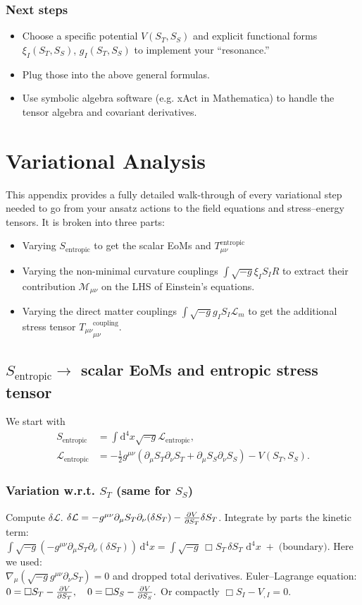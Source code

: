 \documentclass[11pt,a4paper]{article}
\newcommand{\Mmu}{\mathcal{M}}
\newcommand{\ST}{S_T}
\newcommand{\SSp}{S_S}
\newcommand{\Sentropic}{S_{\text{entropic}}}
\newcommand{\Lm}{\mathcal{L}_m}
\newcommand{\Tmnentropic}{T^{\text{entropic}}_{\mu\nu}}
\newcommand{\Adx}{\,\mathrm{d}^4x}
\newcommand{\Tmu}{T_{\mu\nu}}
\begin{document}
\subsubsection{Next steps}
\begin{itemize}
    \item Choose a specific potential $V(\ST,\SSp)$ and explicit functional forms $\xi_I(\ST,\SSp)$, $g_I(\ST,\SSp)$ to implement your ``resonance.''
    \item Plug those into the above general formulas.
    \item Use symbolic algebra software (e.g. xAct in Mathematica) to handle the tensor algebra and covariant derivatives.
\end{itemize}

\section{Variational Analysis}
\label{app:variational}
This appendix provides a fully detailed walk-through of every variational step needed to go from your ansatz actions to the field equations and stress–energy tensors. It is broken into three parts:
\begin{itemize}
    \item Varying $\Sentropic$ to get the scalar EoMs and $\Tmnentropic$
    \item Varying the non-minimal curvature couplings $\int\sqrt{-g}\xi_I S_I R$ to extract their contribution $\Mmu_{\mu\nu}$ on the LHS of Einstein's equations.
    \item Varying the direct matter couplings $\int\sqrt{-g}g_I S_I\Lm$ to get the additional stress tensor ${\Tmu}^{\text{coupling}}_{\mu\nu}$.
\end{itemize}

\subsection{$\Sentropic \to$ scalar EoMs and entropic stress tensor}
We start with
\begin{align*}
\Sentropic&=\int\text{d}^4x\sqrt{-g}\mathcal{L}_{\text{entropic}},\\
\mathcal{L}_{\text{entropic}}&=-\frac{1}{2}g^{\mu\nu}(\partial_\mu\ST\partial_\nu\ST+\partial_\mu\SSp\partial_\nu\SSp)-V(\ST,\SSp).
\end{align*}

\subsubsection{Variation w.r.t. $\ST$ (same for $\SSp$)}
Compute $\delta\mathcal{L}$.
$\delta\mathcal{L}=-g^{\mu\nu}\partial_\mu\ST\partial_\nu(\delta\ST)-\pdv{V}{\ST}\delta\ST$.
Integrate by parts the kinetic term: \\
$\int\sqrt{-g}\left(-g^{\mu\nu}\partial_\mu\ST\partial_\nu(\delta\ST)\right)\Adx=\int\sqrt{-g}\,\Box\ST\,\delta\ST\,\Adx \;+\;\text{(boundary)}.$
Here we used: \\ $\nabla_\mu(\sqrt{-g}g^{\mu\nu}\partial_\nu\ST)=0$ and dropped total derivatives.
Euler–Lagrange equation:
$0=\Box\ST-\pdv{V}{\ST},\quad 0=\Box\SSp-\pdv{V}{\SSp}.$
Or compactly $\Box S_I-V_{,I}=0$.
\end{document}
